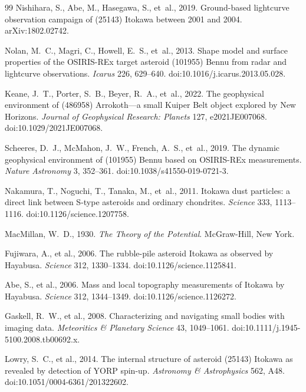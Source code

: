 \documentclass[11pt,a4paper]{article}
\begin{document}
\begin{thebibliography}{99}
Nishihara, S., Abe, M., Hasegawa, S., et~al., 2019. Ground-based lightcurve
observation campaign of (25143) Itokawa between 2001 and 2004.
arXiv:1802.02742.

Nolan, M.~C., Magri, C., Howell, E.~S., et~al., 2013. Shape model and surface
properties of the OSIRIS-REx target asteroid (101955) Bennu from radar and
lightcurve observations. \emph{Icarus} 226, 629--640.
doi:10.1016/j.icarus.2013.05.028.

Keane, J.~T., Porter, S.~B., Beyer, R.~A., et~al., 2022. The geophysical
environment of (486958) Arrokoth---a small Kuiper Belt object explored by
New Horizons. \emph{Journal of Geophysical Research: Planets} 127,
e2021JE007068. doi:10.1029/2021JE007068.

Scheeres, D.~J., McMahon, J.~W., French, A.~S., et~al., 2019. The dynamic
geophysical environment of (101955) Bennu based on OSIRIS-REx measurements.
\emph{Nature Astronomy} 3, 352--361. doi:10.1038/s41550-019-0721-3.

Nakamura, T., Noguchi, T., Tanaka, M., et~al., 2011. Itokawa dust particles:
a direct link between S-type asteroids and ordinary chondrites.
\emph{Science} 333, 1113--1116. doi:10.1126/science.1207758.

MacMillan, W.~D., 1930. \emph{The Theory of the Potential}.
McGraw-Hill, New York.

Fujiwara, A., et al., 2006. The rubble-pile asteroid Itokawa as observed
by Hayabusa. \emph{Science} 312, 1330--1334. doi:10.1126/science.1125841.

Abe, S., et al., 2006. Mass and local topography measurements of Itokawa
by Hayabusa. \emph{Science} 312, 1344--1349. doi:10.1126/science.1126272.

Gaskell, R.~W., et al., 2008. Characterizing and navigating small bodies
with imaging data. \emph{Meteoritics \& Planetary Science} 43, 1049--1061.
doi:10.1111/j.1945-5100.2008.tb00692.x.

Lowry, S.~C., et al., 2014. The internal structure of asteroid (25143)
Itokawa as revealed by detection of YORP spin-up. \emph{Astronomy \&
Astrophysics} 562, A48. doi:10.1051/0004-6361/201322602.


\end{thebibliography}
\end{document}
